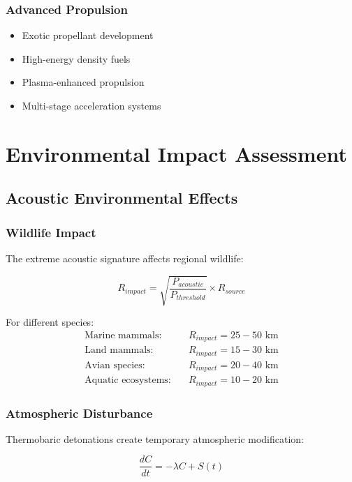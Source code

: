 \documentclass[12pt,a4paper]{article}
\begin{document}
\subsubsection{Advanced Propulsion}
\begin{itemize}
\item Exotic propellant development
\item High-energy density fuels
\item Plasma-enhanced propulsion
\item Multi-stage acceleration systems
\end{itemize}

\section{Environmental Impact Assessment}

\subsection{Acoustic Environmental Effects}

\subsubsection{Wildlife Impact}
The extreme acoustic signature affects regional wildlife:

\begin{equation}
R_{impact} = \sqrt{\frac{P_{acoustic}}{P_{threshold}}} \times R_{source}
\label{eq:wildlife_impact_radius}
\end{equation}

For different species:
\begin{align}
\text{Marine mammals:} &\quad R_{impact} = 25-50 \text{ km} \\
\text{Land mammals:} &\quad R_{impact} = 15-30 \text{ km} \\
\text{Avian species:} &\quad R_{impact} = 20-40 \text{ km} \\
\text{Aquatic ecosystems:} &\quad R_{impact} = 10-20 \text{ km}
\end{align}

\subsubsection{Atmospheric Disturbance}
Thermobaric detonations create temporary atmospheric modification:

\begin{equation}
\frac{dC}{dt} = -\lambda C + S(t)
\label{eq:atmospheric_recovery}
\end{equation}
\end{document}
